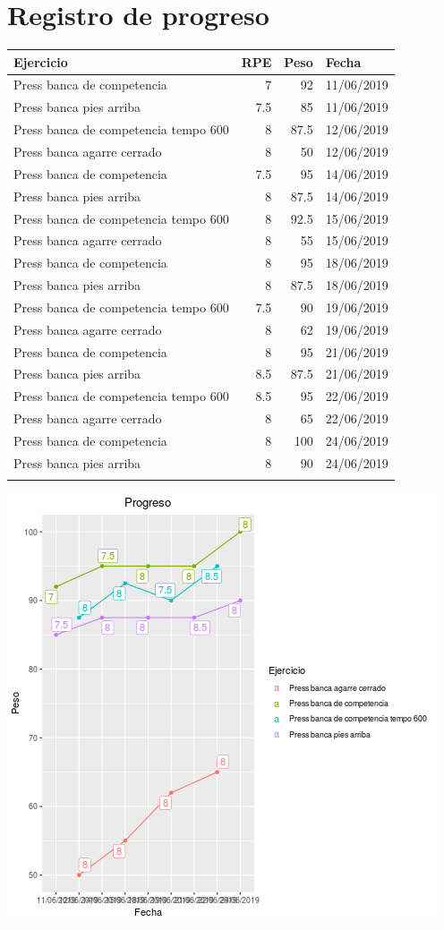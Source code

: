 \documentclass[11pt]{article}
\begin{document}
\section{Registro de progreso}
\label{sec:org14beb4d}
\begin{center}
\label{tab:org47d9044}
\begin{tabular}{lrrl}
Ejercicio & RPE & Peso & Fecha\\
\hline
Press banca de competencia & 7 & 92 & 11/06/2019\\
Press banca pies arriba & 7.5 & 85 & 11/06/2019\\
Press banca de competencia tempo 600 & 8 & 87.5 & 12/06/2019\\
Press banca agarre cerrado & 8 & 50 & 12/06/2019\\
Press banca de competencia & 7.5 & 95 & 14/06/2019\\
Press banca pies arriba & 8 & 87.5 & 14/06/2019\\
Press banca de competencia tempo 600 & 8 & 92.5 & 15/06/2019\\
Press banca agarre cerrado & 8 & 55 & 15/06/2019\\
Press banca de competencia & 8 & 95 & 18/06/2019\\
Press banca pies arriba & 8 & 87.5 & 18/06/2019\\
Press banca de competencia tempo 600 & 7.5 & 90 & 19/06/2019\\
Press banca agarre cerrado & 8 & 62 & 19/06/2019\\
Press banca de competencia & 8 & 95 & 21/06/2019\\
Press banca pies arriba & 8.5 & 87.5 & 21/06/2019\\
Press banca de competencia tempo 600 & 8.5 & 95 & 22/06/2019\\
Press banca agarre cerrado & 8 & 65 & 22/06/2019\\
Press banca de competencia & 8 & 100 & 24/06/2019\\
Press banca pies arriba & 8 & 90 & 24/06/2019\\
 &  &  & \\
\end{tabular}
\end{center}
\begin{center}
\includegraphics[width=.9\linewidth]{tmp.png}
\end{center}
\end{document}
